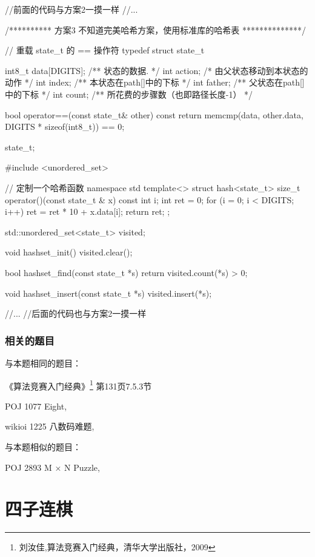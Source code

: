 \begin{Codex}[label=eight_digits_bfs3.cpp]
//前面的代码与方案2一摸一样
//...

/********** 方案3 不知道完美哈希方案，使用标准库的哈希表 **************/

// 重载 state_t 的 == 操作符
typedef struct state_t {
    int8_t data[DIGITS];  /** 状态的数据. */
    int action; /* 由父状态移动到本状态的动作 */
    int index;  /** 本状态在path[]中的下标 */
    int father; /** 父状态在path[]中的下标 */
    int count;  /** 所花费的步骤数（也即路径长度-1） */

    bool operator==(const state_t& other) const {
        return memcmp(data, other.data, DIGITS * sizeof(int8_t)) == 0;
    }
} state_t;

#include <unordered_set>

// 定制一个哈希函数
namespace std {
template<> struct hash<state_t> {
    size_t operator()(const state_t & x) const {
        int i;
        int ret = 0;
        for (i = 0; i < DIGITS; i++)
            ret = ret * 10 + x.data[i];
        return ret;
    }
};
}

std::unordered_set<state_t> visited;

void hashset_init() {
    visited.clear();
}

bool hashset_find(const state_t *s) {
    return visited.count(*s) > 0;
}

void hashset_insert(const state_t *s) {
    visited.insert(*s);
}

//...
//后面的代码也与方案2一摸一样
\end{Codex}

\subsubsection{相关的题目}
与本题相同的题目：
\begindot
\item 《算法竞赛入门经典》\footnote{刘汝佳,算法竞赛入门经典，清华大学出版社，2009} 第131页7.5.3节
\item  POJ 1077 Eight, 
\item  wikioi 1225 八数码难题, 
\myenddot

与本题相似的题目：
\begindot
\item  POJ 2893 M × N Puzzle, 
\myenddot


\section{四子连棋} %

